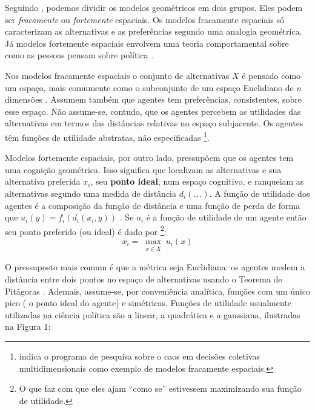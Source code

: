 Seguindo , podemos dividir os modelos
geométricos em dois grupos. Eles podem ser \textit{fracamente} ou
\textit{fortemente} espaciais. Os modelos fracamente espaciais só caracterizam
as alternativas e as preferências segundo uma analogia geométrica. Já modelos
fortemente espaciais envolvem uma teoria comportamental sobre como as pessoas
pensam sobre política \cite{laver2014measuring}.


Nos modelos fracamente espaciais o conjunto de alternativas \(X\) é pensado como
um espaço, mais comumente como o subconjunto de um espaço Euclidiano de \(n\)
dimensões \cite{austen1998social}. Assumem também que agentes tem preferências,
consistentes, sobre esse espaço. Não assume-se, contudo, que os agentes percebem
as utilidades das alternativas em termos das distâncias relativas no espaço
subjacente. Os agentes têm funções de utilidade abstratas, não especificadas
\cite{humphreys2010spatial}\footnote{ indica o
  programa de pesquisa sobre o caos em decisões coletivas multidimensionais
  como exemplo de modelos fracamente espaciais.}.

Modelos fortemente espaciais, por outro lado, pressupõem que os agentes tem uma
cognição geométrica. Isso significa que localizam as alternativas e sua
alternativa preferida \(x_i\), seu \textbf{ponto ideal}, num espaço cognitivo, e
ranqueiam as alternativas segundo uma medida de distância \(d_i(.,.)\). A função
de utilidade dos agentes é a composição da função de distância e uma função de
perda de forma que \(u_i(y) = f_i(d_i(x_i,y)) \) \cite{humphreys2010spatial,
  laver2014measuring}. Se \(u_i\) é a função de utilidade de um agente então seu
ponto preferido (ou ideal) é dado por \cite{binmore2008rational}\footnote{O que
  faz com que eles ajam ``como se'' estivessem maximizando sua função de
  utilidade.}:
\[x_i =\max_{\substack{x \in X}}u_i(x) \]


O pressuposto mais comum é que a métrica seja Euclidiana: os agentes medem a
distância entre dois pontos no espaço de alternativas usando o Teorema de
Pitágoras \cite{munger2015choosing}. Ademais, assume-se, por conveniência
analítica, funções com um único pico ( o ponto ideal do agente) e simétricas.
Funções de utilidade usualmente utilizadas na ciência política são a linear, a
quadrática e a gaussiana, ilustradas na Figura 1:

